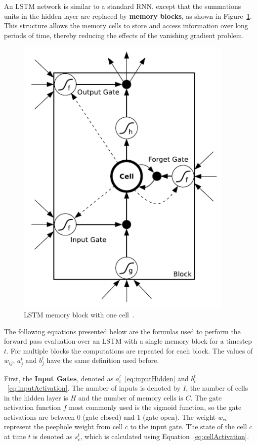 An LSTM network is similar to a standard RNN, except that the summations units in the hidden 
layer are replaced by \textbf{memory blocks}, as shown in Figure~\ref{fig:oneCellLSTM}. This 
structure allows the memory cells to store and access information over long periods of time, 
thereby reducing the effects of the vanishing gradient problem.

\begin{figure}[!h]
    \centering
    \includegraphics[scale=.45]{imagenes/appendices/appendix_a/lstmModel.PNG}
    \caption{LSTM memory block with one cell~\cite{seqlab:Graves2012-385}.}
    \label{fig:oneCellLSTM}
\end{figure}

The following equations presented below are the formulas used to perform the forward pass 
evaluation over an LSTM with a single memory block for a timestep $t$. For multiple blocks 
the computations are repeated for each block. The values of $w_{ij}$, $a_j^t$ and $b_j^t$ 
have the same definition used before. 

First, the \textbf{Input Gates}, denoted as $a_\iota^t$~\ref{eq:inputHidden} and 
$b_\iota^t$~\ref{eq:inputActivation}. The number of inputs 
is denoted by $I$, the number of cells in the hidden layer is $H$ and the number of memory 
cells is $C$. The gate activation function $f$ most commonly used is the sigmoid function, so 
the gate activations are between 0 (gate closed) and 1 (gate open). The weight $w_{c\iota}$ 
represent the peephole weight from cell $c$ to the input gate. The state of the cell $c$ at 
time $t$ is denoted as $s_c^t$, which is calculated using Equation~\ref{eq:cellActivation}.

